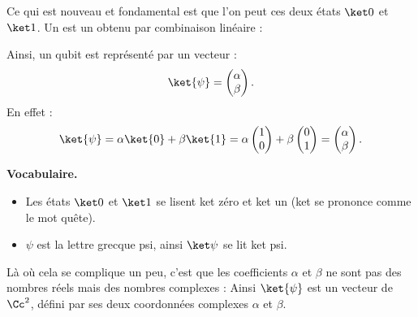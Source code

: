 \documentclass[11pt,class=report,crop=false]{standalone}
\begin{document}

  


\bigskip

Ce qui est nouveau et fondamental est que l'on peut  ces deux états $\ket0$ et $\ket1$.
Un  est un  obtenu par combinaison linéaire :

Ainsi, un qubit est représenté par un vecteur :
$$\ket{\psi} = \begin{pmatrix}\alpha\\\beta\end{pmatrix}.$$
En effet :
$$\ket{\psi} = \alpha \ket{0} + \beta \ket{1} = \alpha \begin{pmatrix}1\\0\end{pmatrix}  + \beta \begin{pmatrix}0\\1\end{pmatrix}
= \begin{pmatrix}\alpha\\\beta\end{pmatrix}.$$



\textbf{Vocabulaire.}
\begin{itemize}
  \item Les états $\ket0$ et $\ket1$ se lisent \og{}ket zéro\fg{} et \og{}ket un\fg{} (\og{}ket\fg{} se prononce comme le mot \og{}quête\fg{}).
  \item $\psi$ est la lettre grecque \og{}psi\fg{}, ainsi $\ket\psi$ se lit \og{}ket psi\fg{}.
\end{itemize}


\bigskip
Là où cela se complique un peu, c'est que les coefficients $\alpha$ et $\beta$ ne sont pas des nombres réels mais des nombres complexes : 
Ainsi $\ket{\psi}$ est un vecteur de $\Cc^2$, défini par ses deux coordonnées complexes $\alpha$ et $\beta$. 




\end{document}
